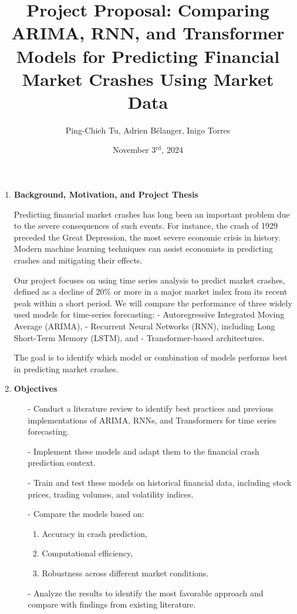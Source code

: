 \documentclass[12pt, letterpaper]{article}
\title{\Large Project Proposal: Comparing ARIMA, RNN, and Transformer Models for Predicting Financial Market Crashes Using Market Data\\}
\author{Ping-Chieh Tu, Adrien Bélanger, Inigo Torres}
\date{November 3$^{\text{rd}}$, 2024}
\begin{document}
\maketitle

\begin{enumerate}[label=]

    \item \textbf{Background, Motivation, and Project Thesis}

    Predicting financial market crashes has long been an important problem due to the severe consequences of such events. For instance, the crash of 1929 preceded the Great Depression, the most severe economic crisis in history. Modern machine learning techniques can assist economists in predicting crashes and mitigating their effects.

    Our project focuses on using time series analysis to predict market crashes, defined as a decline of 20\% or more in a major market index from its recent peak within a short period. We will compare the performance of three widely used models for time-series forecasting: 
    - Autoregressive Integrated Moving Average (ARIMA),
    - Recurrent Neural Networks (RNN), including Long Short-Term Memory (LSTM), and 
    - Transformer-based architectures.

    The goal is to identify which model or combination of models performs best in predicting market crashes.

    \item \textbf{Objectives}

        \begin{itemize}
            \item[-] Conduct a literature review to identify best practices and previous implementations of ARIMA, RNNs, and Transformers for time series forecasting.
            \item[-] Implement these models and adapt them to the financial crash prediction context.
            \item[-] Train and test these models on historical financial data, including stock prices, trading volumes, and volatility indices.
            \item[-] Compare the models based on:
              \begin{enumerate}[label=\alph*.]
                \item Accuracy in crash prediction,
                \item Computational efficiency,
                \item Robustness across different market conditions.
              \end{enumerate}
            \item[-] Analyze the results to identify the most favorable approach and compare with findings from existing literature.
        \end{itemize}


\end{enumerate}
\end{document}

